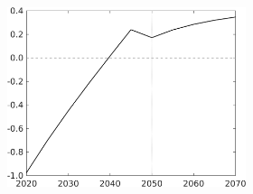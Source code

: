 \begin{figure}[h!!!]
\begin{subfigure}{1\textwidth}
\begin{subfigure}{0.4\textwidth}
	\includegraphics[width=1\textwidth]{../../codding_model/own_basedOnFried/optimalPol_010922_revision/figures/all_13Sept22_Tplus30/sgsff_OPT_T_NoTaus_COMPtaulPer_regime4_spillover0_knspil0_noskill0_sep0_xgrowth0_PV1_etaa0.79.png}
\end{subfigure}
\end{subfigure}


\end{figure}
